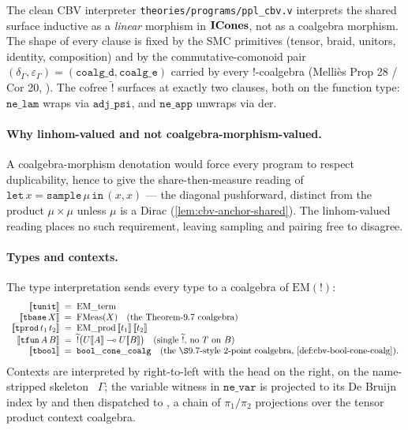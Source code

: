 The clean CBV interpreter \texttt{theories/programs/ppl\_cbv.v}
interprets the shared surface inductive
 as a \emph{linear} morphism in
$\mathbf{ICones}$, not as a coalgebra morphism. The shape of every clause is
fixed by the SMC primitives (tensor, braid, unitors, identity,
composition) and by the commutative-comonoid pair
$(\delta_\Gamma, \varepsilon_\Gamma) =
(\mathtt{coalg\_d}, \mathtt{coalg\_e})$ carried by every
$\mathord{!}$-coalgebra (Melli\`es Prop 28 / Cor 20,
). The cofree
$\widetilde{\mathord{!}}$ surfaces at exactly two clauses, both on the
function type: $\mathtt{ne\_lam}$ wraps via $\mathtt{adj\_psi}$, and
$\mathtt{ne\_app}$ unwraps via $\mathrm{der}$.

\paragraph{Why linhom-valued and not coalgebra-morphism-valued.}
A coalgebra-morphism denotation would force every program to respect
duplicability, hence to give the share-then-measure reading of
$\mathtt{let}\,x = \mathtt{sample}\,\mu\,\mathtt{in}\,(x, x)$ --- the
diagonal pushforward, distinct from the product $\mu \times \mu$ unless
$\mu$ is a Dirac (\autoref{lem:cbv-anchor-shared}). The linhom-valued
reading places no such requirement, leaving sampling and pairing free
to disagree.

\paragraph{Types and contexts.}
The type interpretation
 sends every type to a coalgebra
of $\mathrm{EM}(\mathord{!})$:
\[
  \begin{array}{r@{\;\;=\;\;}l}
    \sem{\mathtt{tunit}}      & \EMterm \\
    \sem{\mathtt{tbase}\,X}   & \FMeas(X)
        \quad\text{(the Theorem-9.7 coalgebra)} \\
    \sem{\mathtt{tprod}\,t_1\,t_2}
                              & \EMprod\,\sem{t_1}\,\sem{t_2} \\
    \sem{\mathtt{tfun}\,A\,B} &
        \widetilde{\mathord{!}}\bigl(U\sem{A} \multimap U\sem{B}\bigr)
        \quad\text{(single $\widetilde{\mathord{!}}$, no $T$ on $B$)} \\
    \sem{\mathtt{tbool}}      &
        \mathtt{bool\_cone\_coalg}
        \quad\text{(the \S9.7-style 2-point coalgebra,
        \autoref{def:cbv-bool-cone-coalg}).}
  \end{array}
\]
Contexts are interpreted by
 right-to-left with the head on
the right, on the name-stripped skeleton
~$\Gamma$; the variable witness
in $\mathtt{ne\_var}$ is projected to its De Bruijn index by
 and then dispatched to
, a chain of
$\pi_1 / \pi_2$ projections over the tensor product context coalgebra.

